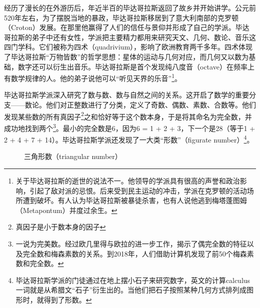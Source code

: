 \documentclass[b5paper]{ctexart}
\begin{document}
经历了漫长的在外游历后，年近半百的毕达哥拉斯返回了故乡并开始讲学。公元前520年左右，为了摆脱当地的暴政，毕达哥拉斯移居到了意大利南部的克罗顿（Croton）发展。在那里他赢得了人们的信任与景仰并形成了自己的学派。毕达哥拉斯的弟子中还有女性，学派把主要精力都用来研究天文、几何、数论、音乐这四门学科。它们被称为四术（quadrivium），影响了欧洲教育两千多年\cite{StepanovRose15}。四术体现了毕达哥拉斯“万物皆数”的哲学思想：星体的运动与几何对应，而几何又以数为基础，数字还可以衍生出音乐。毕达哥拉斯是首个发现纯八度音（octave）在频率上有数学规律的人。他的弟子说他可以“听见天界的乐音”\footnote{关于毕达哥拉斯的逝世的说法不一。他领导的学派具有很高的声誉和政治影响，引起了敌对派的忌恨。后来受到民主运动的冲击，学派在克罗顿的活动场所遭到破坏。有人认为毕达哥拉斯被暴徒杀害，也有人说他逃到梅塔蓬图姆（Metapontum）并度过余生。}。

毕达哥拉斯学派深入研究了数与数、数与自然之间的关系。这开启了数学的重要分支——数论。他们对正整数进行了分类，定义了奇数、偶数、素数、合数等。他们发现某些数的所有真因子\footnote{真因子是小于数本身的因子}之和恰好等于这个数本身，于是将其命名为完全数，并成功地找到两个\footnote{一说为完美数。经过欧几里得与欧拉的进一步工作，揭示了偶完全数的特征以及完全数和梅森素数的关系。到2018年，人们借助计算机发现了前50个梅森素数和完全数。}。最小的完全数是6，因为6 = 1 + 2 + 3，下一个是28（等于1 + 2 + 4 + 7 + 14）。毕达哥拉斯学派还发现了一大类“形数”（figurate number）\footnote{毕达哥拉斯学派的门徒通过在地上摆小石子来研究数字，英文的计算calculus一词就是从希腊文“石子”衍生出的\cite{HanXueTao16}。当他们把石子按照某种几何方式排列成图形时，就得到了形数。}。

\begin{figure}[htbp]
\centering
{}
\caption{三角形数（triangular number）}
\label{fig:triangular-num}
\end{figure}
\end{document}
